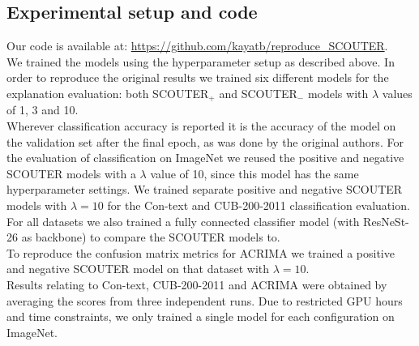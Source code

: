 \subsection{Experimental setup and code}
Our code is available at: \url{https://github.com/kayatb/reproduce_SCOUTER}.
\\
We trained the models using the hyperparameter setup as described above. In order to reproduce the original results we trained six different models for the explanation evaluation: both SCOUTER$_+$ and SCOUTER$_-$ models with $\lambda$ values of 1, 3 and 10. 
\\
Wherever classification accuracy is reported it is the accuracy of the model on the validation set after the final epoch, as was done by the original authors. For the evaluation of classification on ImageNet we reused the positive and negative SCOUTER models with a $\lambda$ value of 10, since this model has the same hyperparameter settings. We trained separate positive and negative SCOUTER models with $\lambda = 10$ for the Con-text and CUB-200-2011 classification evaluation. For all datasets we also trained a fully connected classifier model (with ResNeSt-26 as backbone) to compare the SCOUTER models to.
\\
To reproduce the confusion matrix metrics for ACRIMA we trained a positive and negative SCOUTER model on that dataset with $\lambda = 10$.
\\
 Results relating to Con-text, CUB-200-2011 and ACRIMA were obtained by averaging the scores from three independent runs. Due to restricted GPU hours and time constraints, we only trained a single model for each configuration on ImageNet.
 
